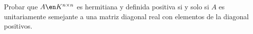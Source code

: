 \begin{enunciado}{\ejercicio}
  Probar que $A \en K^{n \times n}$ es hermitiana y definida positiva si y solo si $A$ es unitariamente semejante
  a una matriz diagonal real con elementos de la diagonal positivos.
\end{enunciado}

\hacer
